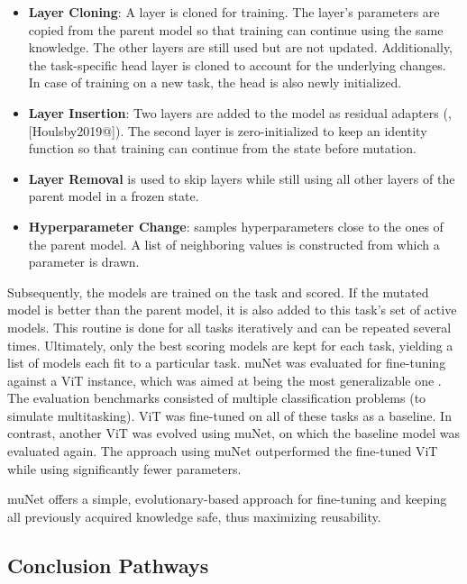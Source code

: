 \documentclass[
]{krantz}
\providecommand{\tightlist}{%
  \setlength{\itemsep}{0pt}\setlength{\parskip}{0pt}}
\begin{document}
\begin{itemize}
\tightlist
\item
  \textbf{Layer Cloning}: A layer is cloned for training. The layer's parameters are copied from the parent model so that training can continue using the same knowledge. The other layers are still used
  but are not updated. Additionally, the task-specific head layer is cloned to account for the underlying changes. In case of training on a new task, the head is also newly initialized.
\item
  \textbf{Layer Insertion}: Two layers are added to the model as residual adapters (\citep{Rebuffi2017}, {[}Houlsby2019@{]}). The second layer is zero-initialized to keep an identity function so that training
  can continue from the state before mutation.
\item
  \textbf{Layer Removal} is used to skip layers while still using all other layers of the parent model in a frozen state.
\item
  \textbf{Hyperparameter Change}: samples hyperparameters close to the ones of the parent model. A list of neighboring values is constructed from which a parameter is drawn.
\end{itemize}

Subsequently, the models are trained on the task and scored. If the mutated model is better than the parent model, it is also added to this task's set of active models. This routine is done for
all tasks iteratively and can be repeated several times. Ultimately, only the best scoring models are kept for each task, yielding a list of models each fit to a particular task.
muNet was evaluated for fine-tuning against a ViT instance, which was aimed at being the most generalizable one \citep{Steiner2021}. The evaluation benchmarks consisted of multiple classification problems
(to simulate multitasking). ViT was fine-tuned on all of these tasks as a baseline. In contrast, another ViT was evolved using muNet, on which the baseline model was evaluated again. The approach using
muNet outperformed the fine-tuned ViT while using significantly fewer parameters.

muNet offers a simple, evolutionary-based approach for fine-tuning and keeping all previously acquired knowledge safe, thus maximizing reusability.

\hypertarget{conclusion-pathways}{%
\subsection{Conclusion Pathways}\label{conclusion-pathways}}
\end{document}
